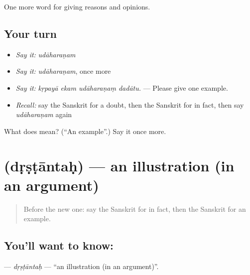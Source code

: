 \begin{grammarlens}[title={What you've built}]
One more word for giving reasons and opinions.
\end{grammarlens}

\subsection*{Your turn}
\begin{itemize}
\raggedright
  \item \emph{Say it:} \emph{udāharaṇam}
  \item \emph{Say it:} \emph{udāharaṇam}, once more
  \item \emph{Say it:} \emph{kṛpayā ekam udāharaṇaṃ dadātu.} — Please give one example.
  \item \emph{Recall:} say the Sanskrit for a doubt, then the Sanskrit for in fact, then say \emph{udāharaṇam} again
\end{itemize}

\begin{tcolorbox}[breakable,colback=teal!4,colframe=teal!35!black,title={Before you move on}]
What does  mean? (\textquotedblleft{}An example\textquotedblright{}.) Say it once more.
\end{tcolorbox}
\section[\texorpdfstring{\sk{दृष्टान्तः} (dṛṣṭāntaḥ)}{दृष्टान्तः (dṛṣṭāntaḥ)}]{ (dṛṣṭāntaḥ) — an illustration (in an argument)}

\label{lesson:SA-C347-drstantah}



\begin{quote}
Before the new one: say the Sanskrit for in fact, then the Sanskrit for an example.
\end{quote}

\subsection*{You'll want to know: }
\textbf{} — \emph{dṛṣṭāntaḥ} — \textquotedblleft{}an illustration (in an argument)\textquotedblright{}.

\begin{quote}
    
\end{quote}

